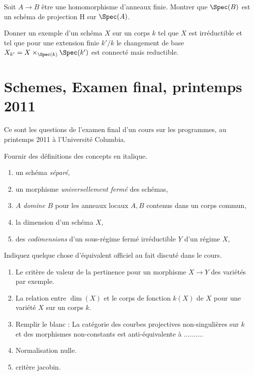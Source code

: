 \begin{exercise}
\label{exercise-finite-is-projective}
Soit $A \to B$ être une homomorphisme d'anneaux finie.
Montrer que $\Spec(B)$ est un schéma de projection H sur $\Spec(A)$.
\end{exercise}

\begin{exercise}
\label{exercise-not-geometrically-irreducible}
Donner un exemple d'un schéma $X$ sur un corps $k$
tel que $X$ est irréductible et tel que pour une extension
finie $k'/k$ le changement de base $X_{k'} = X \times_{\Spec(k)}
\Spec(k')$ est connecté mais reductible.
\end{exercise}





\section{Schemes, Examen final, printemps 2011}
\label{section-final-exam-spring-2011}

\noindent
Ce sont les questions de l'examen final d'un cours sur les
programmes, au printemps 2011 à l'Université Columbia.

\begin{exercise}[Definitions]
\label{exercise-definitions-spring-2011}
Fournir des définitions des concepts en italique.
\begin{enumerate}
\item un schéma {\it séparé},
\item un morphisme {\it universellement fermé} des schémas,
\item {\it $A$ domine $B$} pour les anneaux locaux $A, B$ contenus dans
un corps commun,
\item la dimension {\it} d'un schéma $X$,
\item des {\it codimensions} d'un sous-régime fermé irréductible $Y$ d'un
régime $X$,
\end{enumerate}
\end{exercise}

\begin{exercise}[Results]
\label{exercise-results-spring-2011}
Indiquez quelque chose d'équivalent officiel au fait discuté dans
le cours.
\begin{enumerate}
\item Le critère de valeur de la pertinence pour un morphisme
$X \to Y$ des variétés par exemple.
\item La relation entre $\dim(X)$ et le corps de fonction $k(X)$ de
$X$ pour une variété $X$ sur un corps $k$.
\item Remplir le blanc : La catégorie des courbes projectives non-singulières
sur $k$ et des morphismes non-constants est anti-équivalente à $\ldots\ldots\ldots$.
\item Normalisation nulle.
\item critère jacobin.
\end{enumerate}
\end{exercise}

